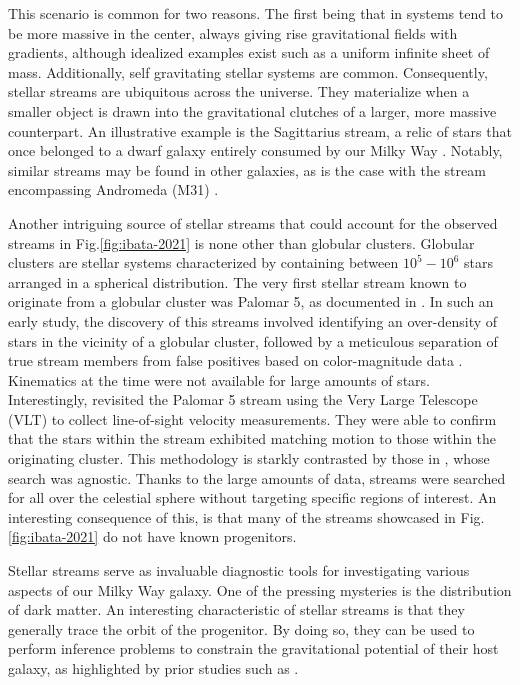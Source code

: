 This scenario is common for two reasons. The first being that in systems tend to be more massive in the center, always giving rise gravitational fields with gradients, although idealized examples exist such as a uniform infinite sheet of mass. Additionally, self gravitating stellar systems are common. Consequently, stellar streams are ubiquitous across the universe. They materialize when a smaller object is drawn into the gravitational clutches of a larger, more massive counterpart. An illustrative example is the Sagittarius stream, a relic of stars that once belonged to a dwarf galaxy entirely consumed by our Milky Way \citep{2001ApJ...551..294I}. Notably, similar streams may be found in other galaxies, as is the case with the stream encompassing Andromeda (M31) \citep{2001Natur.412...49I}.


Another intriguing source of stellar streams that could account for the observed streams in Fig.\ref{fig:ibata-2021} is none other than globular clusters. Globular clusters are stellar systems characterized by containing between $10^5-10^6$ stars arranged in a spherical distribution. The very first stellar stream known to originate from a globular cluster was Palomar 5, as documented in \citep{2001ApJ...548L.165O}. In such an early study, the discovery of this streams involved identifying an over-density of stars in the vicinity of a globular cluster, followed by a meticulous separation of true stream members from false positives based on color-magnitude data \citep{2003AJ....126.2385O}. Kinematics at the time were not available for large amounts of stars. Interestingly, \citet{2009AJ....137.3378O} revisited the Palomar 5 stream using the Very Large Telescope (VLT) to collect line-of-sight velocity measurements. They were able to confirm that the stars within the stream exhibited matching motion to those within the originating cluster. This methodology is starkly contrasted by those in \citet{2021ApJ...914..123I}, whose search was agnostic. Thanks to the large amounts of data, streams were searched for all over the celestial sphere without targeting specific regions of interest. An interesting consequence of this, is that many of the streams showcased in Fig.\ref{fig:ibata-2021} do not have known progenitors.



Stellar streams serve as invaluable diagnostic tools for investigating various aspects of our Milky Way galaxy. One of the pressing mysteries is the distribution of dark matter. An interesting characteristic of stellar streams is that they generally trace the orbit of the progenitor. By doing so, they can be used to perform inference problems to constrain the gravitational potential of their host galaxy, as highlighted by prior studies such as \citet{2011MNRAS.417..198V}.

